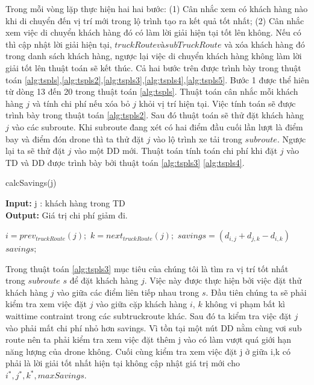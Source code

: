 \documentclass[a4paper,12pt]{report}
\begin{document}
Trong mỗi vòng lặp thực hiện hai hai bước: (1) Cân nhắc xem có khách hàng nào khi di chuyển đến vị trí mới trong lộ trình tạo ra kết quả tốt nhất; (2) Cân nhắc xem việc di chuyển khách hàng đó có làm lời giải hiện tại tốt lên không. Nếu có thì cập nhật lời giải hiện tại, $truckRoute và subTruckRoute$ và xóa khách hàng đó trong danh sách khách hàng, ngược lại việc di chuyển khách hàng không làm lời giải tốt lên thuật toán sẽ kết thúc. Cả hai bước trên được trình bày trong thuật toán \ref{alg:tspls},\ref{alg:tspls2},\ref{alg:tspls3},\ref{alg:tspls4},\ref{alg:tspls5}.
Bước 1 được thể hiên từ dòng 13 đến 20 trong thuật toán \ref{alg:tspls}. Thuật toán cân nhắc mỗi khách hàng $j$ và tính chi phí nếu xóa bỏ $j$ khỏi vị trí hiện tại. Việc tính toán sẽ được trình bày trong thuật toán \ref{alg:tspls2}. Sau đó thuật toán sẽ thử đặt khách hàng $j$ vào các subroute. Khi subroute đang xét có hai điểm đầu cuối lần lượt là điểm bay và điểm đón drone thì ta thử đặt $j$ vào lộ trình xe tải trong $subroute$. Ngược lại ta sẽ thử đặt $j$ vào một \ac{DD} mới. Thuật toán tính toán chi phí khi đặt $j$ vào \ac{TD} và \ac{DD} được trình bày bởi thuật toán \ref{alg:tspls3} \ref{alg:tspls4}.   \\

\begin{algorithm}[H]
\caption{calcSavings(j)}
\textbf{Input:} j : khách hàng trong TD\\
\textbf{Output:} Giá trị chi phí giảm đi.
\begin{algorithmic}[1]
\State $i=prev_{truckRoute}(j);$
\State $k=next_{truckRoute}(j);$
\State $savings=(d_{i,j}+d_{j,k}-d_{i,k})$
\Return $savings;$
\end{algorithmic}

\label{alg:tspls2}
\end{algorithm}

Trong thuật toán \ref{alg:tspls3} mục tiêu của chúng tôi là tìm ra vị trí tốt nhất trong $subroute$ $s$ để đặt khách hàng $j$. Việc này được thực hiện bởi việc đặt thử khách hàng $j$ vào giữa các điểm liên tiếp nhau trong $s$. Đầu tiên chúng ta sẽ phải kiểm tra xem việc đặt $j$ vào giữa cặp khách hàng $i$, $k$ không vi phạm bất kì waittime contraint trong các subtruckroute khác. Sau đó ta kiểm tra việc đặt $j$ vào phải mất chi phí nhỏ hơn savings. Vì tồn tại một nút \ac{DD} nằm cùng vơi sub route nên ta phải kiểm tra xem việc đặt thêm j vào có làm vượt quá giới hạn năng lượng của drone không. Cuối cùng kiểm tra xem việc đặt j ở giữa i,k  có phải là lời giải tốt nhất hiện tại không cập nhật giá trị mới cho $i^*,j^*,k^*, maxSavings$.\\
\end{document}
